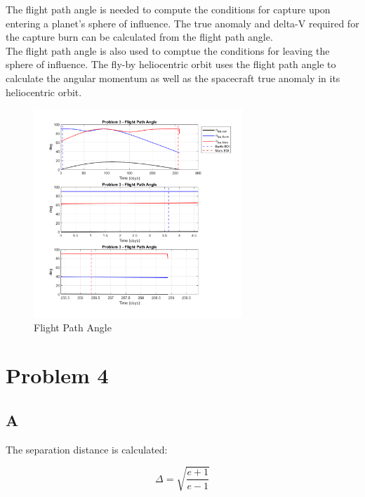 \documentclass[conf]{new-aiaa}
\begin{document}
The flight path angle is needed to compute the conditions for capture upon entering a planet's sphere of influence. The true anomaly and delta-V required for the capture burn can be calculated from the flight path angle. \\ 

The flight path angle is also used to comptue the conditions for leaving the sphere of influence. The fly-by heliocentric orbit uses the flight path angle to calculate the angular momentum as well as the spacecraft true anomaly in its heliocentric orbit. 

\begin{figure}[H]
    \centering 
    \includegraphics[width=0.7\textwidth]{Problem 3 - Flight Path Angle.pdf}
    \caption{Flight Path Angle}
\end{figure}



\section*{Problem 4}

\subsection*{A}

The separation distance is calculated: 

\begin{equation}
    \Delta = \sqrt{\frac{e + 1}{e - 1}} 
\end{equation}
\end{document}
